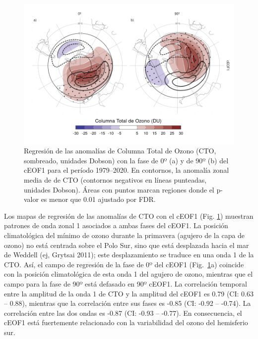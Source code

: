 \documentclass[12pt,oneside,a4paper]{reedthesis}
\begin{document}
\begin{figure}

{\centering \includegraphics{figures/20-ceofs/o3-regr-1} 

}

\caption{Regresión de las anomalías de Columna Total de Ozono (CTO, sombreado, unidades Dobson) con la fase de 0º (a) y de 90º (b) del cEOF1 para el período 1979--2020. En contornos, la anomalía zonal media de de CTO (contornos negativos en líneas punteadas, unidades Dobson). Áreas con puntos marcan regiones donde el p-valor es menor que 0.01 ajustado por FDR.}\label{fig:o3-regr}
\end{figure}



Los mapas de regresión de las anomalías de CTO con el cEOF1 (Fig. \ref{fig:o3-regr}) muestran patrones de onda zonal 1 asociados a ambas fases del cEOF1.
La posición climatológica del mínimo de ozono durante la primavera (agujero de la capa de ozono) no está centrada sobre el Polo Sur, sino que está desplazada hacia el mar de Weddell (ej, Grytsai 2011); este desplazamiento se traduce en una onda 1 de la CTO.
Así, el campo de regresión de la fase de 0º del cEOF1 (Fig.~\ref{fig:o3-regr}a) coincide con la posición climatológica de esta onda 1 del agujero de ozono, mientras que el campo para la fase de 90º está defasado en 90º cEOF1.
La correlación temporal entre la amplitud de la onda 1 de CTO y la amplitud del cEOF1 es 0.79 (CI: 0.63 -- 0.88), mientras que la correlación entre sus fases es -0.85 (CI: -0.92 -- -0.74).
La correlación entre las dos ondas es -0.87 (CI: -0.93 -- -0.77).
En consecuencia, el cEOF1 está fuertemente relacionado con la variabilidad del ozono del hemisferio sur.
\end{document}
